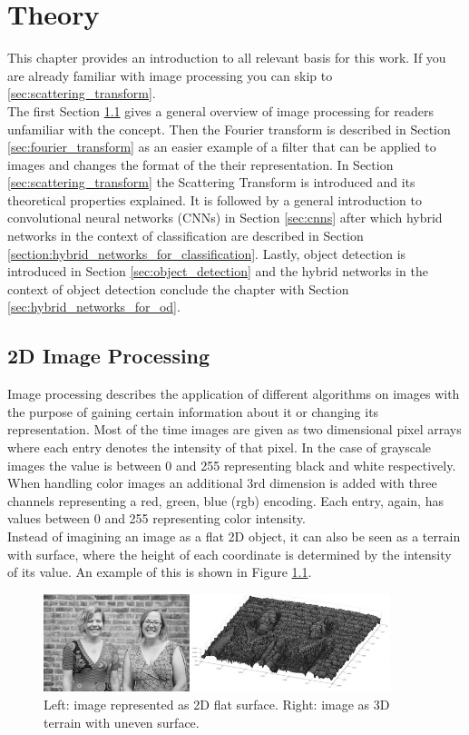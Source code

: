 \chapter{Theory}
\label{chap:theory}

This chapter provides an introduction to all relevant basis for this work. If you are already familiar with image processing you can skip to \ref{sec:scattering_transform}. \\
The first Section \ref{sec:2D_image_processing} gives a general overview of image processing for readers unfamiliar with the concept. Then the Fourier transform is described in Section \ref{sec:fourier_transform} as an easier example of a filter that can be applied to images and changes the format of the their representation. In Section \ref{sec:scattering_transform} the Scattering Transform is introduced and its theoretical properties explained. It is followed by a general introduction to convolutional neural networks (CNNs) in Section \ref{sec:cnns} after which hybrid networks in the context of classification are described in Section \ref{section:hybrid_networks_for_classification}. Lastly, object detection is introduced in Section \ref{sec:object_detection} and the hybrid networks in the context of object detection conclude the chapter with Section \ref{sec:hybrid_networks_for_od}. 

\section{2D Image Processing}
\label{sec:2D_image_processing}

Image processing describes the application of different algorithms on images with the purpose of gaining certain information about it or changing its representation. Most of the time images are given as two dimensional pixel arrays where each entry denotes the intensity of that pixel. In the case of grayscale images the value is between 0 and 255 representing black and white respectively. When handling color images an additional 3rd dimension is added with three channels representing a red, green, blue (rgb) encoding. Each entry, again, has values between 0 and 255 representing color intensity. \\
Instead of imagining an image as a flat 2D object, it can also be seen as a terrain with surface, where the height of each coordinate is determined by the intensity of its value. An example of this is shown in Figure \ref{fig:image_surfaces}. 


\begin{figure}[!htb]
	\centering
	\includegraphics[width = 0.9\textwidth]{images/image_surfaces.jpg}
	\caption{Left: image represented as 2D flat surface. Right: image as 3D terrain with uneven surface. \protect\footnotemark}
	\label{fig:image_surfaces}
\end{figure}

